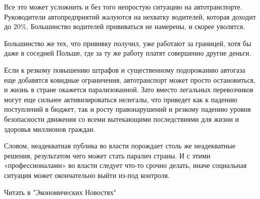 Все это может усложнить и без того непростую ситуацию на автотранспорте.
Руководители автопредприятий жалуются на нехватку водителей, которая доходит до
20\%. Большинство водителей прививаться не намерены, и скорее уволятся.

Большинство же тех, что прививку получил, уже работают за границей, хотя бы
даже в соседней Польше, где за ту же работу платят совершенно другие деньги.

Если к резкому повышению штрафов и существенному подорожанию автогаза еще
добавятся ковидные ограничения, автотранспорт может просто остановиться, и
жизнь в стране окажется парализованной. Зато вместо легальных перевозчиков
могут еще сильнее активизироваться нелегалы, что приведет как к падению
поступлений в бюджет, так и росту правонарушений и резкому падению уровня
безопасности движения со всеми вытекающими последствиями для жизни и здоровья
миллионов граждан.

Словом, неадекватная публика во власти порождает столь же неадекватные решения,
результатом чего может стать паралич страны. И с этими «профессионалами» во
власти следует что-то срочно делать, иначе социальная ситуация может
окончательно выйти из-под контроля.

Читать в "Экономических Новостях"

